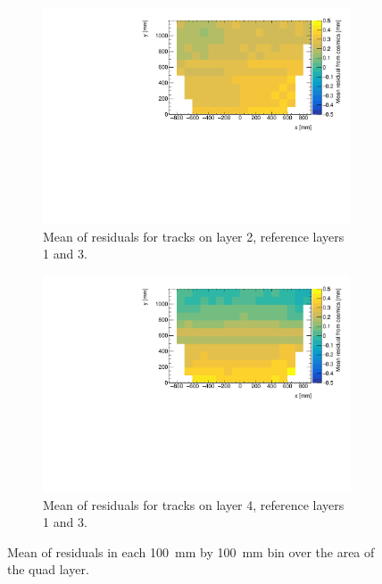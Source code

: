 \begin{figure}
\centering
\begin{subfigure}{0.85\textwidth}
  \centering
  \includegraphics[width=\linewidth]{figures/figure_QL2P11_3100V_2021-08-05_th2_means_layer2_fixedlayers13.pdf}
  \caption{Mean of residuals for tracks on layer 2, reference layers 1 and 3.}
  \label{fig:res_mean_th2_L2_F13}
\end{subfigure}%
\vspace*{\floatsep}
\begin{subfigure}{0.85\textwidth}
  \centering
  \includegraphics[width=\linewidth]{figures/figure_QL2P11_3100V_2021-08-05_th2_means_layer4_fixedlayers13.pdf}
  \caption{Mean of residuals for tracks on layer 4, reference layers 1 and 3.}
  \label{fig:res_mean_th2_L4_F13}
\end{subfigure}
\caption{Mean of residuals in each \SI{100}{\milli\meter} by \SI{100}{\milli\meter} bin over the area of the quad layer.}
\label{fig:res_mean_th2}
\end{figure}

